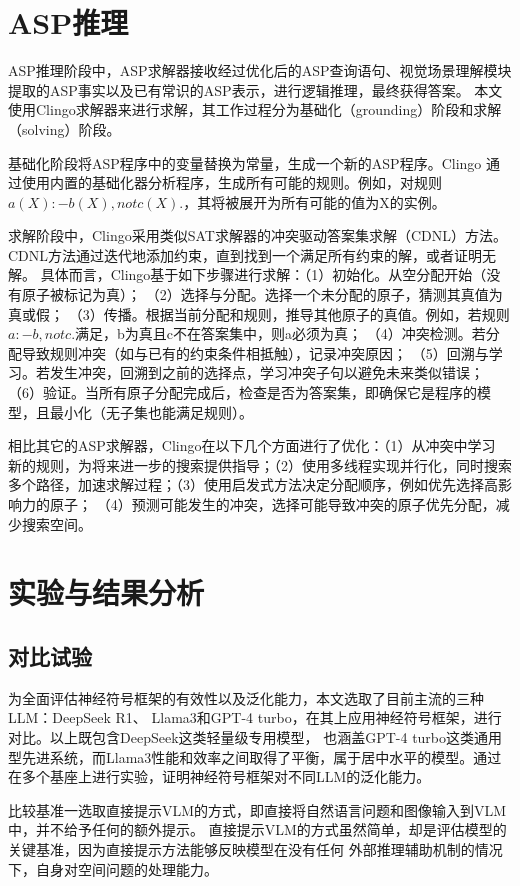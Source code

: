 \section{ASP推理}
ASP推理阶段中，ASP求解器接收经过优化后的ASP查询语句、视觉场景理解模块提取的ASP事实以及已有常识的ASP表示，进行逻辑推理，最终获得答案。
本文使用Clingo求解器来进行求解，其工作过程分为基础化（grounding）阶段和求解（solving）阶段。

基础化阶段将ASP程序中的变量替换为常量，生成一个新的ASP程序。Clingo
通过使用内置的基础化器分析程序，生成所有可能的规则。例如，对规则
$a(X) :- b(X), not c(X).$，其将被展开为所有可能的值为X的实例。

求解阶段中，Clingo采用类似SAT求解器的冲突驱动答案集求解（CDNL）方法。CDNL方法通过迭代地添加约束，直到找到一个满足所有约束的解，或者证明无解。
具体而言，Clingo基于如下步骤进行求解：（1）初始化。从空分配开始（没有原子被标记为真）；
（2）选择与分配。选择一个未分配的原子，猜测其真值为真或假；
（3）传播。根据当前分配和规则，推导其他原子的真值。例如，若规则$a :- b, not c.$满足，b为真且c不在答案集中，则a必须为真；
（4）冲突检测。若分配导致规则冲突（如与已有的约束条件相抵触），记录冲突原因；
（5）回溯与学习。若发生冲突，回溯到之前的选择点，学习冲突子句以避免未来类似错误；
（6）验证。当所有原子分配完成后，检查是否为答案集，即确保它是程序的模型，且最小化（无子集也能满足规则）。

相比其它的ASP求解器，Clingo在以下几个方面进行了优化：（1）从冲突中学习
新的规则，为将来进一步的搜索提供指导；（2）使用多线程实现并行化，同时搜索
多个路径，加速求解过程；（3）使用启发式方法决定分配顺序，例如优先选择高影响力的原子；
（4）预测可能发生的冲突，选择可能导致冲突的原子优先分配，减少搜索空间。
\section{实验与结果分析}
\subsection{对比试验}
为全面评估神经符号框架的有效性以及泛化能力，本文选取了目前主流的三种LLM：DeepSeek R1、
Llama3和GPT-4 turbo，在其上应用神经符号框架，进行对比。以上既包含DeepSeek这类轻量级专用模型，
也涵盖GPT-4 turbo这类通用型先进系统，而Llama3性能和效率之间取得了平衡，属于居中水平的模型。通过
在多个基座上进行实验，证明神经符号框架对不同LLM的泛化能力。

比较基准一选取直接提示VLM的方式，即直接将自然语言问题和图像输入到VLM中，并不给予任何的额外提示。
直接提示VLM的方式虽然简单，却是评估模型的关键基准，因为直接提示方法能够反映模型在没有任何
外部推理辅助机制的情况下，自身对空间问题的处理能力。

